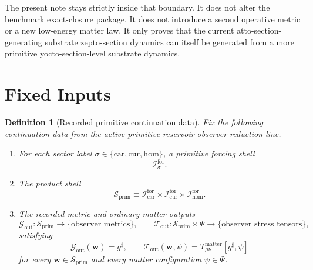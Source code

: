 \documentclass[11pt]{article}
\newcommand{\CompletedMetric}{g^{\sharp}}
\newcommand{\MatterSpace}{\Psi}
\newcommand{\Car}{\mathrm{car}}
\newcommand{\Cur}{\mathrm{cur}}
\newcommand{\Hom}{\mathrm{hom}}
\newcommand{\ForSpace}[1]{\mathcal I_{#1}^{\mathrm{for}}}
\newcommand{\PrimShell}{\mathcal S_{\mathrm{prim}}}
\newcommand{\MetricOut}{\mathscr G_{\mathrm{out}}}
\newcommand{\MatterOut}{\mathscr T_{\mathrm{out}}}
\newtheorem{definition}{Definition}
\begin{document}
The present note stays strictly inside that boundary. It does not alter the benchmark exact-closure package. It does not introduce a second operative metric or a new low-energy matter law. It only proves that the current atto-section-generating substrate zepto-section dynamics can itself be generated from a more primitive yocto-section-level substrate dynamics.

\section{Fixed Inputs}

\begin{definition}[Recorded primitive continuation data]
\label{def:fixed}
Fix the following continuation data from the active primitive-reservoir observer-reduction line.
\begin{enumerate}
    \item For each sector label \(\sigma\in\{\Car,\Cur,\Hom\}\), a primitive forcing shell
    \[
    \ForSpace{\sigma}.
    \]
    \item The product shell
    \[
    \PrimShell
    \equiv
    \ForSpace{\Car}\times \ForSpace{\Cur}\times \ForSpace{\Hom}.
    \]
    \item The recorded metric and ordinary-matter outputs
    \[
    \MetricOut:\PrimShell\to\{\text{observer metrics}\},
    \qquad
    \MatterOut:\PrimShell\times\MatterSpace\to\{\text{observer stress tensors}\},
    \]
    satisfying
    \begin{equation}
    \MetricOut(\mathbf w)=\CompletedMetric,
    \qquad
    \MatterOut(\mathbf w,\psi)
    =
    T_{\mu\nu}^{\mathrm{matter}}[\CompletedMetric,\psi]
    \label{eq:fixedoutputs}
    \end{equation}
    for every \(\mathbf w\in\PrimShell\) and every matter configuration \(\psi\in\MatterSpace\).
\end{enumerate}
\end{definition}
\end{document}
